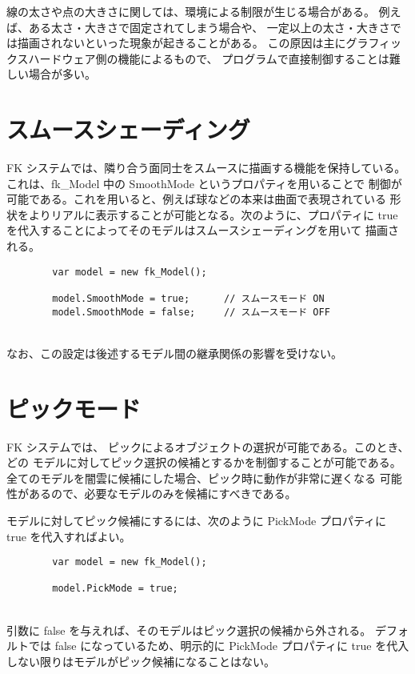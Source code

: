 線の太さや点の大きさに関しては、環境による制限が生じる場合がある。
例えば、ある太さ・大きさで固定されてしまう場合や、
一定以上の太さ・大きさでは描画されないといった現象が起きることがある。
この原因は主にグラフィックスハードウェア側の機能によるもので、
プログラムで直接制御することは難しい場合が多い。

\section{スムースシェーディング} \label{sec:smooth}
FK システムでは、隣り合う面同士をスムースに描画する機能を保持している。
これは、fk\_Model 中の SmoothMode というプロパティを用いることで
制御が可能である。これを用いると、例えば球などの本来は曲面で表現されている
形状をよりリアルに表示することが可能となる。次のように、プロパティに
true を代入することによってそのモデルはスムースシェーディングを用いて
描画される。
\\
\begin{screen}
\begin{verbatim}
        var model = new fk_Model();

        model.SmoothMode = true;      // スムースモード ON
        model.SmoothMode = false;     // スムースモード OFF
\end{verbatim}
\end{screen}
~ \\
なお、この設定は後述するモデル間の継承関係の影響を受けない。
\section{ピックモード}
FK システムでは、
ピックによるオブジェクトの選択が可能である。このとき、どの
モデルに対してピック選択の候補とするかを制御することが可能である。
全てのモデルを闇雲に候補にした場合、ピック時に動作が非常に遅くなる
可能性があるので、必要なモデルのみを候補にすべきである。

モデルに対してピック候補にするには、次のように PickMode プロパティに
true を代入すればよい。
\\
\begin{screen}
\begin{verbatim}
        var model = new fk_Model();

        model.PickMode = true;
\end{verbatim}
\end{screen}
~ \\
引数に false を与えれば、そのモデルはピック選択の候補から外される。
デフォルトでは false になっているため、明示的に PickMode プロパティに
true を代入しない限りはモデルがピック候補になることはない。

